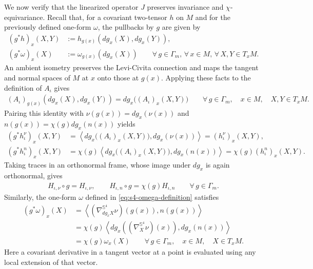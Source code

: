 \documentclass[a4paper,11pt,oneside,reqno]{amsart}
\numberwithin{equation}{section}
\theoremstyle{definition}
\begin{document}
We now verify that the linearized operator $J$ preserves invariance and $\chi$-equivariance. Recall that, for a covariant two-tensor $h$
on $M$ and for the previously defined one-form $\omega$,
the pullbacks by $g$ are given by
%
\begin{align*}
    (g^*h)_x(X,Y)&:=h_{g(x)}(d g_x(X),d g_x(Y)),\\
    (g^*\omega)_x(X)&:=\omega_{g(x)}(d g_x(X))
    \qquad\forall\,g\in\Gamma_m,\,\forall\,x\in M,\,\forall\,X,Y\in T_xM.
\end{align*}
%
An ambient isometry preserves the Levi-Civita connection
and maps the tangent and normal spaces of $M$ at $x$
onto those at $g(x)$. Applying these facts to the
definition of $A_\iota$ gives
%
\begin{align*}
    (A_\iota)_{g(x)}(d g_x(X),d g_x(Y))
    =d g_x\bigl((A_\iota)_x(X,Y)\bigr)
    \qquad\forall\,g\in\Gamma_m,\quad x\in M,\quad
    X,Y\in T_xM.
\end{align*}
%
Pairing this identity with $\nu(g(x))=d g_x(\nu(x))$
and $n(g(x))=\chi(g)d g_x(n(x))$ yields
%
\begin{align*}
    (g^*h_\iota^\nu)_x(X,Y)
    &=
    \left\langle d g_x\bigl((A_\iota)_x(X,Y)\bigr),
    d g_x(\nu(x))\right\rangle
    =(h_\iota^\nu)_x(X,Y),\\
    (g^*h_\iota^n)_x(X,Y)
    &=
    \chi(g)\left\langle
    d g_x\bigl((A_\iota)_x(X,Y)\bigr),d g_x(n(x))
    \right\rangle
    =\chi(g)(h_\iota^n)_x(X,Y).
\end{align*}
%
Taking traces in an orthonormal frame, whose image under
$d g_x$ is again orthonormal, gives
%
\begin{align*}
    H_{\iota,\nu}\circ g=H_{\iota,\nu},
    \qquad
    H_{\iota,n}\circ g=\chi(g)H_{\iota,n}
    \qquad\forall\,g\in\Gamma_m.
\end{align*}
%
Similarly, the one-form $\omega$ defined in
\eqref{eq:s4-omega-definition} satisfies
%
\begin{align*}
    (g^*\omega)_x(X)
    &=
    \left\langle
    \left(\nabla^{\mathbb S^4}_{d g_xX}\nu\right)(g(x)),
    n(g(x))\right\rangle\\
    &=
    \chi(g)\left\langle
    d g_x\left(\left(\nabla^{\mathbb S^4}_X\nu\right)(x)\right),
    d g_x(n(x))\right\rangle\\
    &=\chi(g)\omega_x(X)
    \qquad\forall\,g\in\Gamma_m,\quad x\in M,\quad X\in T_xM.
\end{align*}
%
Here a covariant derivative in a tangent vector at a point
is evaluated using any local extension of that vector.
\end{document}
